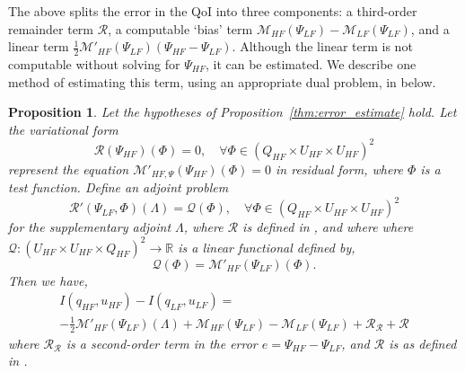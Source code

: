 \documentclass[review,sort&compress]{elsarticle}
\newcommand{\R}{{\mathbb{R}}}
\newcommand{\red}[1]{{\color{red}{#1}}}
\newtheorem{proposition}{Proposition}
\begin{document}
The above  splits the error in the QoI into three components: a third-order remainder term $\mathcal{R}$, a computable `bias' term $\mathcal{M}_{HF}(\Psi_{LF})-\mathcal{M}_{LF}(\Psi_{LF})$, and a linear term $\frac{1}{2}\mathcal{M}'_{HF}(\Psi_{LF})(\Psi_{HF}-\Psi_{LF})$. Although the linear term is not computable without solving for $\Psi_{HF}$, it can be estimated. We describe one method of estimating this term, using an appropriate dual problem, in  below.

%
\begin{proposition}
\label{thm:error_estimate_dual}
Let the hypotheses of Proposition~\ref{thm:error_estimate} hold. Let the variational form
%
\begin{equation}
\mathscr{R}(\Psi_{HF})(\Phi)=0,\quad\forall\Phi\in(Q_{HF}\times U_{HF}\times U_{HF})^2
\label{eq:supadjsys_prop}
\end{equation}
%
represent the equation $\mathcal{M}'_{HF,\Psi}(\Psi_{HF})(\Phi)=0$ in residual form, where $\Phi$ is a test function. Define an adjoint problem
%
\begin{equation}
\mathscr{R}'(\Psi_{LF},\Phi)(\Lambda)=\mathcal{Q}(\Phi),\quad\forall\Phi\in(Q_{HF}\times U_{HF}\times U_{HF})^2
\label{eq:superAdjEq}
\end{equation}
for the supplementary adjoint $\Lambda$, where $\mathscr{R}$ is defined in , and where
%
%
where $\mathcal{Q}:(U_{HF} \times U_{HF} \times Q_{HF})^2 \to \R$ is a linear functional defined by,
%
\begin{equation}
\mathcal{Q}(\Phi)=\mathcal{M}'_{HF}(\Psi_{LF})(\Phi).
\label{eq:supadjout}
\end{equation}
%
Then we have,
%
\begin{multline}
\label{eq:finErrExp}
I(q_{HF},u_{HF})-I(q_{LF},u_{LF})=\\-\frac{1}{2}\mathcal{M}'_{HF}(\Psi_{LF})(\Lambda)+\mathcal M_{HF}(\Psi_{LF})-\mathcal M_{LF}(\Psi_{LF}) + \mathcal{R}_{\mathscr{R}} + \mathcal{R}
\end{multline}
%
where $\mathcal{R}_{\mathscr{R}}$ is a second-order term in the error $e=\Psi_{HF}-\Psi_{LF}$, and $\mathcal{R}$ is as defined in . %
%
\end{proposition}
\end{document}
